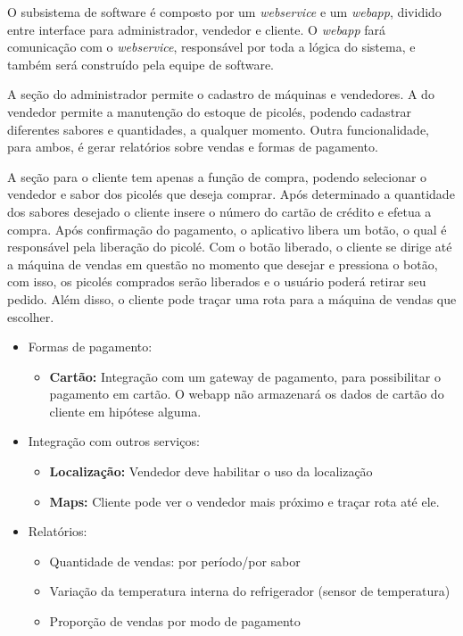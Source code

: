 O subsistema de software é composto por um \textit{webservice} e um \textit{webapp}, dividido entre interface para administrador, vendedor e cliente. O \textit{webapp} fará comunicação com o \textit{webservice}, responsável por toda a lógica do sistema, e também será construído pela equipe de software.

A seção do administrador permite o cadastro de máquinas e vendedores. A do vendedor permite a manutenção do estoque de picolés, podendo cadastrar diferentes sabores e quantidades, a qualquer momento. Outra funcionalidade, para ambos, é gerar relatórios sobre vendas e formas de pagamento.

A seção para o cliente tem apenas a função de compra, podendo selecionar o vendedor e sabor dos picolés que deseja comprar. Após determinado a quantidade dos sabores desejado o cliente insere o número do cartão de crédito e efetua a compra. Após confirmação do pagamento, o aplicativo libera um botão, o qual é responsável pela liberação do picolé. Com o botão liberado, o cliente se dirige até a máquina de vendas em questão no momento que desejar e pressiona o botão, com isso, os picolés comprados serão liberados e o usuário poderá retirar seu pedido. Além disso, o cliente pode traçar uma rota para a máquina de vendas que escolher.

\begin{itemize}
	\item Formas de pagamento:
    \begin{itemize}
        \item \textbf{Cartão:} Integração com um gateway de pagamento, para possibilitar o pagamento em cartão. O webapp não armazenará os dados de cartão do cliente em hipótese alguma.
  	\end{itemize}

	\item Integração com outros serviços:
  	\begin{itemize}
    	\item \textbf{Localização:} Vendedor deve habilitar o uso da localização
    	\item \textbf{Maps:} Cliente pode ver o vendedor mais próximo e traçar rota até ele.
  	\end{itemize}

	\item Relatórios:
  	\begin{itemize}
        \item Quantidade de vendas: por período/por sabor
        \item Variação da temperatura interna do refrigerador (sensor de temperatura)
        \item Proporção de vendas por modo de pagamento
  	\end{itemize}
\end{itemize}


